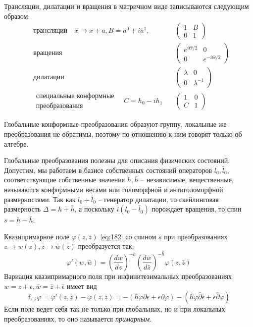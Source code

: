\documentclass[a4paper,12pt]{article}
\theoremstyle{definition}
\theoremstyle{definition}
\theoremstyle{definition}
\begin{document}
Трансляции, дилатации и вращения в матричном виде записываются следующим образом:
\begin{eqnarray}
  \label{eq:233}
  &\mbox{трансляции} \quad x\to x+a, B=a^{0}+i a^{1},\quad &
  \begin{pmatrix}
    1 & B\\
    0 & 1
  \end{pmatrix}\\
  &\mbox{вращения}\quad &
  \begin{pmatrix}
    e^{i \Theta/2} & 0\\
    0 & e^{-i \Theta/2}
  \end{pmatrix}\\
  & \mbox{дилатации}\quad &
  \begin{pmatrix}
    \lambda & 0\\
    0 & \lambda^{-1}
  \end{pmatrix}\\
  &\begin{array}{r}
  \mbox{специальные конформные}    \\
  \mbox{преобразования}
  \end{array} 
  \quad
  C=h_{0}-i h_{1}\quad &
  \begin{pmatrix}
    1 & 0\\
    C & 1
  \end{pmatrix}
\end{eqnarray}

Глобальные конформные преобразования образуют группу, локальные же преобразования не обратимы, поэтому по отношению к ним говорят только об алгебре.

Глобальные преобразования полезны для описания физических состояний. Допустим, мы работаем в базисе собственных состояний операторов $l_{0}, \bar l_{0}$, соответствующие собственные значения $h,\bar h$ -- независимые, вещественные, называются конформными весами или голоморфной и антиголоморфной размерностями. Так как $l_{0}+\bar l_{0}$ -- генератор дилатации, то скейлинговая размерность $\Delta=h+\bar h$, а поскольку $i(l_{0}-\bar l_{0})$ порождает вращения, то спин $s=h-\bar h$.

Квазипримарное поле $\varphi(z,\bar z)$ \eqref{eq:182} со спином $s$ при преобразованиях $z\to w(z), \bar z\to \bar w(\bar z)$ преобразуется так:
\begin{equation}
  \label{eq:234}
  \varphi'(w,\bar w)=\left( \frac{d w}{d z}\right)^{-h}\left( \frac{d \bar w}{d \bar z}\right)^{-\bar h} \varphi(z,\bar z)
\end{equation}
Вариация квазипримарного поля при инфинитезимальных преобразованиях $w=z+\epsilon, \bar w =\bar z +\bar \epsilon$ имеет вид
\begin{equation}
  \label{eq:235}
  \delta_{\epsilon,\bar \epsilon} \varphi=\varphi'(z,\bar z)-\varphi(z,\bar z)=-(h\varphi \partial \epsilon +\epsilon \partial \varphi) - (\bar h \varphi\bar \partial \bar \epsilon+\bar \epsilon \bar \partial \varphi)
\end{equation}
Если поле ведет себя так не только при глобальных, но и при локальных преобразованиях, то оно называется {\it примарным}.
\end{document}
